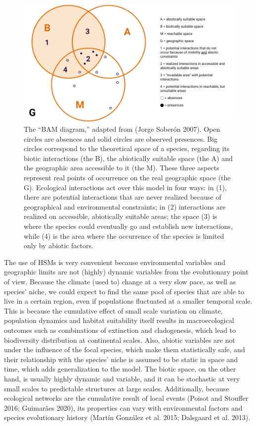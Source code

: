 \documentclass[11pt]{article}
\makeatletter
\def\maxwidth{\ifdim\Gin@nat@width>\linewidth\linewidth
\else\Gin@nat@width\fi}
\let\Oldincludegraphics\includegraphics
\renewcommand{\includegraphics}[1]{\Oldincludegraphics[width=\maxwidth]{#1}}
\makeatother
\begin{document}
\begin{figure}
\hypertarget{fig:bam}{%
\centering
\includegraphics{figures/bam.png}
\caption{The ``BAM diagram,'' adapted from (Jorge Soberón 2007). Open
circles are absences and solid circles are observed presences. Big
circles correspond to the theoretical space of a species, regarding its
biotic interactions (the B), the abiotically suitable space (the A) and
the geographic area accessible to it (the M). These three aspects
represent real points of occurrence on the real geographic space (the
G). Ecological interactions act over this model in four ways: in (1),
there are potential interactions that are never realized because of
geographical and environmental constraints; in (2) interactions are
realized on accessible, abiotically suitable areas; the space (3) is
where the species could eventually go and establish new interactions,
while (4) is the area where the occurrence of the species is limited
only by abiotic factors.}\label{fig:bam}
}
\end{figure}

The use of HSMs is very convenient because environmental variables and
geographic limits are not (highly) dynamic variables from the
evolutionary point of view. Because the climate (used to) change at a
very slow pace, as well as species' niche, we could expect to find the
same pool of species that are able to live in a certain region, even if
populations fluctuated at a smaller temporal scale. This is because the
cumulative effect of small scale variation on climate, population
dynamics and habitat suitability itself results in macroecological
outcomes such as combinations of extinction and cladogenesis, which lead
to biodiversity distribution at continental scales. Also, abiotic
variables are not under the influence of the focal species, which make
them statistically safe, and their relationship with the species' niche
is assumed to be static in space and time, which adds generalization to
the model. The biotic space, on the other hand, is usually highly
dynamic and variable, and it can be stochastic at very small scales to
predictable structures at large scales. Additionally, because ecological
networks are the cumulative result of local events (Poisot and Stouffer
2016; Guimarães 2020), its properties can vary with environmental
factors and species evolutionary history (Martín González et al. 2015;
Dalsgaard et al. 2013).
\end{document}
